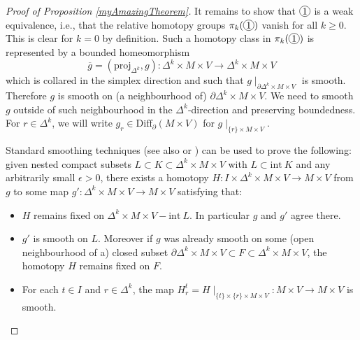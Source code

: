 \documentclass[a4paper, oneside]{amsart}
\newcommand{\diff}{\mathrm{Diff}}
\newcommand{\1}{\mathds{1}}
\newcommand*\circled[1]{\tikz[baseline=(char.base)]{%
            \node[shape=circle,draw,inner sep=1pt] (char) {#1};}}
\theoremstyle{remark}
\theoremstyle{definition}
\numberwithin{equation}{section}
\begin{document}
\begin{proof}[Proof of Proposition \ref{myAmazingTheorem}]
It remains to show that $\circled{1}$ is a weak equivalence, i.e., that the relative homotopy groups $\pi_k(\circled{1})$ vanish for all $k\geq 0$. This is clear for $k=0$ by definition. Such a homotopy class in $\pi_k(\circled{1})$ is represented by a bounded homeomorphism
$$
\overline{g}=(\mathrm{proj}_{\Delta^k},g): \Delta^k\times M\times V\longrightarrow \Delta^k\times M\times V
$$
which is collared in the simplex direction and such that $g\mid_{\partial \Delta^k\times M\times V}$ is smooth. Therefore $g$ is smooth on (a neighbourhood of) $\partial \Delta^k\times M\times V$. We need to smooth $g$ outside of such neighbourhood in the $\Delta^k$-direction and preserving boundedness. For $r\in \Delta^k$, we will write $g_r\in \diff_\partial(M\times V)$ for $g\mid_{\{r\}\times M\times V}$.

Standard smoothing techniques \cite[\S 4]{Munkres}  (see also \cite[Prop. 6.4.2]{Kupers} or \cite[Prop. 1]{LurieSimplicialDiffGroups}) can be used to prove the following: given nested compact subsets $L\subset K\subset \Delta^k\times M\times V$ with $L\subset \mathrm{int}\ K$ and any arbitrarily small $\epsilon>0$, there exists a homotopy $H:I\times \Delta^k\times M\times V\to M\times V$ from $g$ to some map $g': \Delta^k\times M\times V\to M\times V$ satisfying that:
\begin{itemize}
    \item[$(i)$] $H$ remains fixed on $\Delta^k\times M\times V-\mathrm{int}\ L$. In particular $g$ and $g'$ agree there.

    \item[$(ii)$] $g'$ is smooth on $L$. Moreover if $g$ was already smooth on some (open neighbourhood of a) closed subset $\partial \Delta^k\times M\times V\subset F\subset \Delta^k\times M\times V$, the homotopy $H$ remains fixed on $F$. 

    \item[$(iii)$] For each $t\in I$ and $r\in \Delta^k$, the map $H^t_r=H\mid_{\{t\}\times\{r\}\times M\times V}: M\times V\to M\times V$ is smooth.


\end{itemize}
\end{proof}
\end{document}
